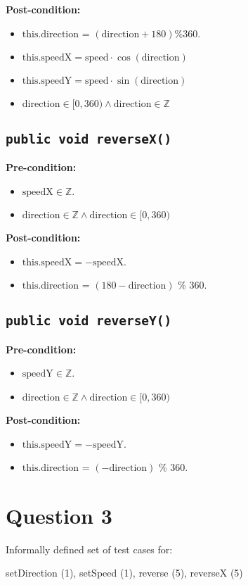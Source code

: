 \documentclass{article}
\begin{document}
\textbf{Post-condition:}
\begin{itemize}
    \item \( \text{this.direction} \) = \( (\text{direction} + 180) \% 360 \).
    \item \( \text{this.speedX} = \text{speed} \cdot \cos(\text{direction}) \)
    \item \( \text{this.speedY} = \text{speed} \cdot \sin(\text{direction}) \)
    \item \( \text{direction} \in [0,360) \wedge \text{direction} \in \mathbb{Z} \)
\end{itemize}

\subsection*{\texttt{public void reverseX()}}
\textbf{Pre-condition:}
\begin{itemize}
    \item \( \text{speedX} \in \mathbb{Z} \).
    \item \( \text{direction} \in \mathbb{Z} \wedge \text{direction} \in [0,360) \)
\end{itemize}

\textbf{Post-condition:}
\begin{itemize}
    \item \( \text{this.speedX} = -\text{speedX} \).
    \item \( \text{this.direction} \) = \( (180 - \text{direction}) \) \% 360.
\end{itemize}

\subsection*{\texttt{public void reverseY()}}
\textbf{Pre-condition:}
\begin{itemize}
    \item \( \text{speedY} \in \mathbb{Z} \).
    \item \( \text{direction} \in \mathbb{Z} \wedge \text{direction} \in [0,360) \)
\end{itemize}

\textbf{Post-condition:}
\begin{itemize}
    \item \( \text{this.speedY} = -\text{speedY} \).
    \item \( \text{this.direction} \) = \( (-\text{direction}) \) \% 360.
\end{itemize}

\section*{Question 3}

Informally defined set of test cases for:

setDirection (1), setSpeed (1), reverse (5), reverseX (5)
\end{document}
